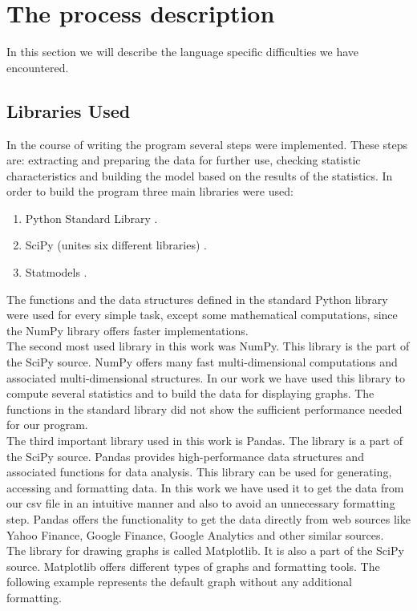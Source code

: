 \documentclass[
  twoside,
  11pt, a4paper,
  footinclude=true,
  headinclude=true,
  cleardoublepage=empty
]{scrreprt}
\begin{document}
    \section{The process description}
    In this section we will describe the language specific difficulties we have encountered.
    \subsection{Libraries Used}
    In the course of writing the program several steps were implemented. These steps are: extracting and preparing the data for further use, checking statistic characteristics and building the model based on the results of the statistics. In order to build the program three main libraries were used:
    \begin{enumerate}
        \item Python Standard Library \cite{python:Doc}.
        \item SciPy (unites six different libraries) \cite{python:SciPy}.
        \item Statmodels \cite{python:Statsmodels}.
    \end{enumerate}
    The functions and the data structures defined in the standard Python library were used for every simple task, except some mathematical computations, since the NumPy library offers faster implementations.\\
    The second most used library in this work was NumPy. This library is the part of the SciPy source. NumPy offers many fast multi-dimensional computations and associated multi-dimensional structures. In our work we have used this library to compute several statistics and to build the data for displaying graphs. The functions in the standard library did not show the sufficient performance needed for our program.\\
    The third important library used in this work is Pandas. The library is a part of the SciPy source. Pandas provides high-performance data structures and associated functions for data analysis. This library can be used for generating, accessing and formatting data. In this work we have used it to get the data from our csv file in an intuitive manner and also to avoid an unnecessary formatting step. Pandas offers the functionality to get the data directly from web sources like Yahoo Finance, Google Finance, Google Analytics and other similar sources.\\
    The library for drawing graphs is called Matplotlib. It is also a part of the SciPy source. Matplotlib offers different types of graphs and formatting tools. The following example represents the default graph without any additional formatting.
    
\end{document}
